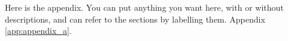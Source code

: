 Here is the appendix. You can put anything you want here, with or without descriptions, and can refer to the sections by labelling them. Appendix \ref{app:appendix_a}.
